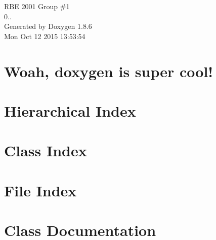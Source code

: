 \documentclass[twoside]{book}
\newcommand{\clearemptydoublepage}{%
  \newpage{\pagestyle{empty}\cleardoublepage}%
}
\begin{document}
\hypersetup{pageanchor=false}
\begin{titlepage}
\vspace*{7cm}
\begin{center}%
{\Large R\-B\-E 2001 Group \#1 \\[1ex]\large 0.. }\\
\vspace*{1cm}
{\large Generated by Doxygen 1.8.6}\\
\vspace*{0.5cm}
{\small Mon Oct 12 2015 13:53:54}\\
\end{center}
\end{titlepage}
\clearemptydoublepage
\tableofcontents
\clearemptydoublepage
{}
\hypersetup{pageanchor=true}

\chapter{Woah, doxygen is super cool!}
\label{index}\hypertarget{index}{}
\chapter{Hierarchical Index}

\chapter{Class Index}

\chapter{File Index}

\chapter{Class Documentation}

































\end{document}
